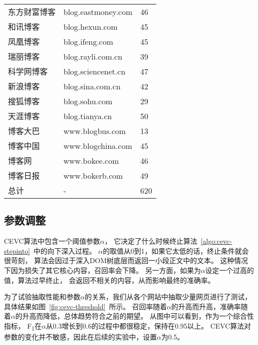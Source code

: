 \begin{table}[htbp]
\begin{minipage}{0.45\textwidth}
\begin{tabular}{lll}
东方财富博客 & blog.eastmoney.com & 46 \\
和讯博客 & blog.hexun.com & 45 \\
凤凰博客 & blog.ifeng.com & 45 \\
瑞丽博客 & blog.rayli.com.cn & 39 \\
科学网博客 & blog.sciencenet.cn & 47 \\
新浪博客 & blog.sina.com.cn & 42 \\
搜狐博客 & blog.sohu.com & 29 \\
天涯博客 & blog.tianya.cn & 50 \\
博客大巴 & www.blogbus.com & 13 \\
博客中国 & www.blogchina.com & 45 \\
博客网 & www.bokee.com & 46 \\
博客日报 & www.bokerb.com & 49 \\
总计 & - & 620 \\
\bottomrule[1.5pt]
\end{tabular}
\end{minipage}
\end{table}

\subsection{参数调整}
CEVC算法中包含一个阈值参数$\alpha$，
它决定了什么时候终止算法~\ref{algo:cevc-stepinto}~中的向下深入过程。
$\alpha$的取值从0到1，如果它太低的话，终止条件就会很苛刻，
算法会因过于深入DOM树底层而返回一小段正文中的文本。
这种情况下因为损失了其它核心内容，召回率会下降。
另一方面，如果为$\alpha$设定一个过高的值，算法过早终止，
会返回不相关的内容，从而影响最终的准确率。

为了试验抽取性能和参数$\alpha$的关系，我们从各个网站中抽取少量网页进行了测试，
具体结果如图~\ref{fig:cevc-threshold}~所示。
召回率随着$\alpha$的升高而升高，准确率随着$\alpha$的升高而降低，总体趋势符合之前的期望。
从图中可以看到，作为一个综合性指标，
F\textsubscript{1}在$\alpha$从0.3增长到0.6的过程中都很稳定，保持在0.95以上。
CEVC算法对参数的变化并不敏感，因此在后续的实验中，设置$\alpha$为0.5。

